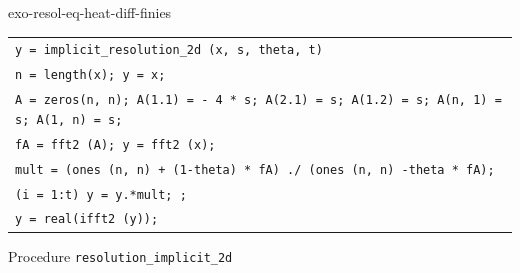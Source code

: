 \begin{correction}{exo-resol-eq-heat-diff-finies}
\begin{enumerate}
\begin{listing} 
\begin{footnotesize}
{\upshape
\begin{tabular}{l} \texttt{\pfunction y = implicit\_resolution\_2d (x, s, theta, t)} \\
\texttt{n = length(x); y = x;} \\
\texttt{A = zeros(n, n); A(1.1) = - 4 * s; A(2.1) = s; A(1.2) = s; A(n, 1) = s; A(1, n) = s;} \\
\texttt{fA = fft2 (A); y = fft2 (x);} \\
\texttt{mult = (ones (n, n) + (1-theta) * fA) ./ (ones (n, n) -theta * fA);} \\
\texttt{\pfor{}(i = 1:t) y = y.*mult; \pend{};} \\
\texttt{y = real(ifft2 (y));} \\
\end{tabular}
}
\end{footnotesize}
\caption{Procedure \texttt{\upshape resolution\_implicit\_2d}}
\label{listing-resolimplicite2d}
\end{listing}
\end{enumerate}
\end{correction}
 
